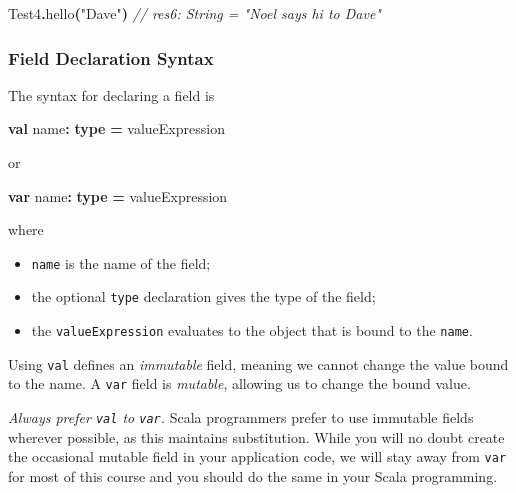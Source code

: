 \documentclass[11pt,a5paper,]{book}
\newenvironment{Shaded}{\begin{snugshade}}{\end{snugshade}}
\newcommand{\CommentTok}[1]{\textcolor[rgb]{0.56,0.35,0.01}{\textit{#1}}}
\newcommand{\FunctionTok}[1]{\textcolor[rgb]{0.00,0.00,0.00}{#1}}
\newcommand{\KeywordTok}[1]{\textcolor[rgb]{0.13,0.29,0.53}{\textbf{#1}}}
\newcommand{\NormalTok}[1]{#1}
\newcommand{\OperatorTok}[1]{\textcolor[rgb]{0.81,0.36,0.00}{\textbf{#1}}}
\newcommand{\StringTok}[1]{\textcolor[rgb]{0.31,0.60,0.02}{#1}}
\providecommand{\tightlist}{%
  \setlength{\itemsep}{0pt}\setlength{\parskip}{0pt}}
\begin{document}
\begin{Shaded}
\begin{Highlighting}[]
\NormalTok{Test4}\OperatorTok{.}\FunctionTok{hello}\OperatorTok{(}\StringTok{"Dave"}\OperatorTok{)}
\CommentTok{// res6: String = "Noel says hi to Dave"}
\end{Highlighting}
\end{Shaded}

\hypertarget{field-declaration-syntax}{%
\subsubsection*{Field Declaration
Syntax}\label{field-declaration-syntax}}

The syntax for declaring a field is

\begin{Shaded}
\begin{Highlighting}[]
\KeywordTok{val}\NormalTok{ name}\OperatorTok{:} \KeywordTok{type} \OperatorTok{=}\NormalTok{ valueExpression}
\end{Highlighting}
\end{Shaded}

or

\begin{Shaded}
\begin{Highlighting}[]
\KeywordTok{var}\NormalTok{ name}\OperatorTok{:} \KeywordTok{type} \OperatorTok{=}\NormalTok{ valueExpression}
\end{Highlighting}
\end{Shaded}

where

\begin{itemize}
\tightlist
\item
  \texttt{name} is the name of the field;
\item
  the optional \texttt{type} declaration gives the type of the field;
\item
  the \texttt{valueExpression} evaluates to the object that is bound to
  the \texttt{name}.
\end{itemize}

Using \texttt{val} defines an \emph{immutable} field, meaning we cannot
change the value bound to the name. A \texttt{var} field is
\emph{mutable}, allowing us to change the bound value.

\emph{Always prefer \texttt{val} to \texttt{var}.} Scala programmers
prefer to use immutable fields wherever possible, as this maintains
substitution. While you will no doubt create the occasional mutable
field in your application code, we will stay away from \texttt{var} for
most of this course and you should do the same in your Scala
programming.
\end{document}
